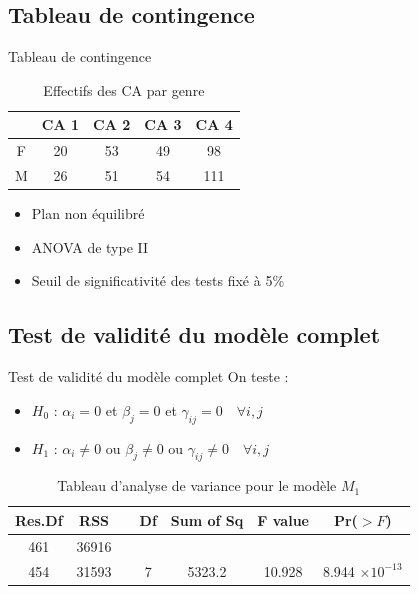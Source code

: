 \documentclass{beamer}
\begin{document}
	\subsection{Tableau de contingence}
	\begin{frame}{Tableau de contingence}
		\begin{table}[H]
			\centering
			\caption{Effectifs des CA par genre}
			\begin{tabular}{ccccc}
				\toprule
				& CA 1 & CA 2 & CA 3 & CA 4 \\ 
				\midrule
				F & 20 & 53 & 49 & 98 \\ 
				M & 26 & 51 & 54 & 111 \\ 
				\bottomrule
			\end{tabular}
			\label{tab:ca_gender}
		\end{table}
		
		\begin{itemize}
			\item Plan non équilibré
			\vfill
			\item ANOVA de type II
			\vfill
			\item Seuil de significativité des tests fixé à 5\%
		\end{itemize}
	\end{frame}
	
	
	\subsection{Test de validité du modèle complet}
	\begin{frame}{Test de validité du modèle complet}
		On teste :
		\begin{itemize}
			\item \textbf{$H_0$} : $\alpha_i = 0$ et $\beta_j = 0$ et $\gamma_{ij} = 0 \quad \forall i, j$
			\item \textbf{$H_1$} : $\alpha_i \neq 0$ ou $\beta_j \neq 0$ ou $\gamma_{ij} \neq 0 \quad \forall  i, j$
		\end{itemize}
		
		\begin{table}[H]
			\centering
			\caption{Tableau d'analyse de variance pour le modèle $M_1$}
			\begin{tabular}{ccccccc}
				\toprule
				\textbf{Res.Df} & \textbf{RSS} & & \textbf{Df} & \textbf{Sum of Sq} & \textbf{F value} & \textbf{Pr($>F$)} \\ 
				\midrule
				461 & 36916 & & & & & \\ 
				454 & 31593 & & 7 & 5323.2 & 10.928 & 8.944 $\times 10^{-13}$ \\ 
				\bottomrule
			\end{tabular}
			\label{tab:anova_results1}
		\end{table}
	\end{frame}
	
\end{document}
